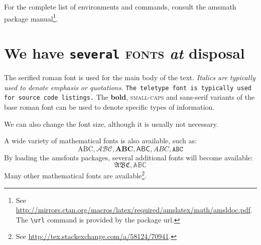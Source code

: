 \documentclass[
  digital, %
  table,   %
  lof,     %
  lot,     %
]{fithesis3}
\begin{document}
For the complete list of environments and commands, consult the
\textsf{amsmath} package manual\footnote{
  See \url{http://mirrors.ctan.org/macros/latex/required/amslatex/math/amsldoc.pdf}.
  The \texttt{\textbackslash url} command is provided by the
  package \textsf{url}.
}.

\chapter{\textnormal{We \textsf{have} \texttt{several} \textsc{fonts}
  \textit{at} \textbf{disposal}}}
The serified roman font is used for the main body of the text.
\textit{Italics are typically used to denote emphasis or
quotations.} \texttt{The teletype font is typically used for source
code listings.} The \textbf{bold}, \textsc{small-caps} and
\textsf{sans-serif} variants of the base roman font can be used to
denote specific types of information.

\tiny We \scriptsize can \footnotesize also \small change \normalsize
the \large font \Large size, \LARGE although \huge it \Huge
is \huge usually \LARGE not \Large necessary.\normalsize

A wide variety of mathematical fonts is also available, such as: \[
  \mathrm{ABC}, \mathcal{ABC}, \mathbf{ABC}, \mathsf{ABC},
  \mathit{ABC}, \mathtt{ABC}
\] By loading the \textsf{amsfonts} packages, several additional
fonts will become available: \[
  \mathfrak{ABC}, \mathbb{ABC}
\] Many other mathematical fonts are available\footnote{
  See \url{http://tex.stackexchange.com/a/58124/70941}.
}.
\end{document}

